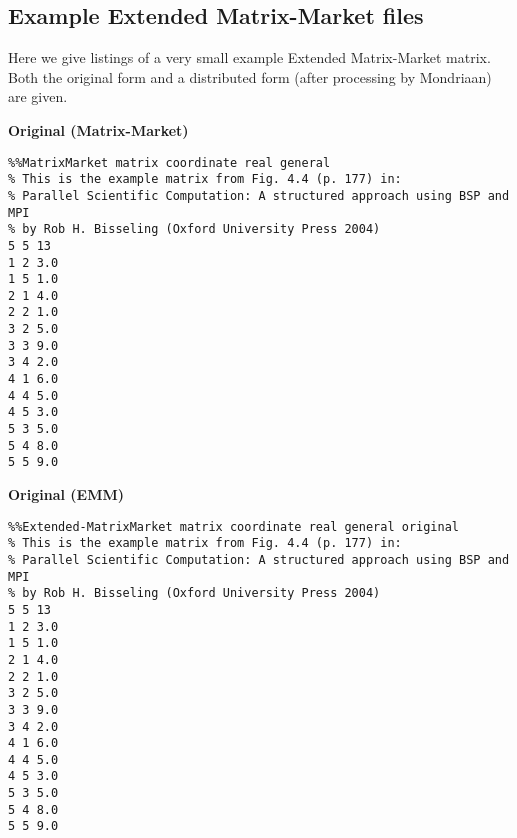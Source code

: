\documentclass[final]{amsart}
\begin{document}
\begin{appendix}
\section{Example Extended Matrix-Market files}
Here we give listings of a very small example Extended Matrix-Market matrix.
Both the original form and a distributed form (after processing by Mondriaan) are given.

\vspace{1em}
\noindent\textbf{Original (Matrix-Market)}
\begin{verbatim}
%%MatrixMarket matrix coordinate real general
% This is the example matrix from Fig. 4.4 (p. 177) in:
% Parallel Scientific Computation: A structured approach using BSP and MPI
% by Rob H. Bisseling (Oxford University Press 2004)
5 5 13
1 2 3.0
1 5 1.0
2 1 4.0
2 2 1.0
3 2 5.0
3 3 9.0
3 4 2.0
4 1 6.0
4 4 5.0
4 5 3.0
5 3 5.0
5 4 8.0
5 5 9.0
\end{verbatim}

\vspace{1em}
\noindent\textbf{Original (EMM)}
\begin{verbatim}
%%Extended-MatrixMarket matrix coordinate real general original
% This is the example matrix from Fig. 4.4 (p. 177) in:
% Parallel Scientific Computation: A structured approach using BSP and MPI
% by Rob H. Bisseling (Oxford University Press 2004)
5 5 13
1 2 3.0
1 5 1.0
2 1 4.0
2 2 1.0
3 2 5.0
3 3 9.0
3 4 2.0
4 1 6.0
4 4 5.0
4 5 3.0
5 3 5.0
5 4 8.0
5 5 9.0
\end{verbatim}


\end{appendix}
\end{document}
